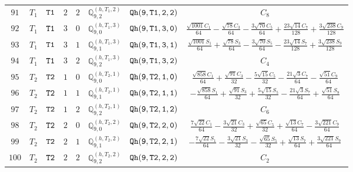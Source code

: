 \documentclass[fleqn,8pt]{jsarticle}
\begin{document}
\begin{table}[ht!]
\begin{center}
\begin{tabular}{cccccccc}
$ 91 $ & $ T_{1} $ & $ {\tt T1} $ & $ 2 $ & $ 2 $ & $ \mathbb{Q}_{9,2}^{(h,T_{1},2)} $ & $ {\tt Qh(9,T1,2,2)} $ & $ C_{8} $ \\
$ 92 $ & $ T_{1} $ & $ {\tt T1} $ & $ 3 $ & $ 0 $ & $ \mathbb{Q}_{9,0}^{(h,T_{1},3)} $ & $ {\tt Qh(9,T1,3,0)} $ & $ \frac{\sqrt{1001} C_{1}}{64} - \frac{\sqrt{78} C_{3}}{64} - \frac{3 \sqrt{70} C_{5}}{64} + \frac{23 \sqrt{14} C_{7}}{128} + \frac{3 \sqrt{238} C_{9}}{128} $ \\
$ 93 $ & $ T_{1} $ & $ {\tt T1} $ & $ 3 $ & $ 1 $ & $ \mathbb{Q}_{9,1}^{(h,T_{1},3)} $ & $ {\tt Qh(9,T1,3,1)} $ & $ \frac{\sqrt{1001} S_{1}}{64} + \frac{\sqrt{78} S_{3}}{64} - \frac{3 \sqrt{70} S_{5}}{64} - \frac{23 \sqrt{14} S_{7}}{128} + \frac{3 \sqrt{238} S_{9}}{128} $ \\
$ 94 $ & $ T_{1} $ & $ {\tt T1} $ & $ 3 $ & $ 2 $ & $ \mathbb{Q}_{9,2}^{(h,T_{1},3)} $ & $ {\tt Qh(9,T1,3,2)} $ & $ C_{4} $ \\
$ 95 $ & $ T_{2} $ & $ {\tt T2} $ & $ 1 $ & $ 0 $ & $ \mathbb{Q}_{9,0}^{(h,T_{2},1)} $ & $ {\tt Qh(9,T2,1,0)} $ & $ \frac{\sqrt{858} C_{1}}{64} + \frac{\sqrt{91} C_{3}}{32} - \frac{5 \sqrt{15} C_{5}}{32} - \frac{21 \sqrt{3} C_{7}}{64} - \frac{\sqrt{51} C_{9}}{64} $ \\
$ 96 $ & $ T_{2} $ & $ {\tt T2} $ & $ 1 $ & $ 1 $ & $ \mathbb{Q}_{9,1}^{(h,T_{2},1)} $ & $ {\tt Qh(9,T2,1,1)} $ & $ - \frac{\sqrt{858} S_{1}}{64} + \frac{\sqrt{91} S_{3}}{32} + \frac{5 \sqrt{15} S_{5}}{32} - \frac{21 \sqrt{3} S_{7}}{64} + \frac{\sqrt{51} S_{9}}{64} $ \\
$ 97 $ & $ T_{2} $ & $ {\tt T2} $ & $ 1 $ & $ 2 $ & $ \mathbb{Q}_{9,2}^{(h,T_{2},1)} $ & $ {\tt Qh(9,T2,1,2)} $ & $ C_{6} $ \\
$ 98 $ & $ T_{2} $ & $ {\tt T2} $ & $ 2 $ & $ 0 $ & $ \mathbb{Q}_{9,0}^{(h,T_{2},2)} $ & $ {\tt Qh(9,T2,2,0)} $ & $ \frac{7 \sqrt{22} C_{1}}{64} - \frac{3 \sqrt{21} C_{3}}{32} + \frac{\sqrt{65} C_{5}}{32} + \frac{\sqrt{13} C_{7}}{64} - \frac{3 \sqrt{221} C_{9}}{64} $ \\
$ 99 $ & $ T_{2} $ & $ {\tt T2} $ & $ 2 $ & $ 1 $ & $ \mathbb{Q}_{9,1}^{(h,T_{2},2)} $ & $ {\tt Qh(9,T2,2,1)} $ & $ - \frac{7 \sqrt{22} S_{1}}{64} - \frac{3 \sqrt{21} S_{3}}{32} - \frac{\sqrt{65} S_{5}}{32} + \frac{\sqrt{13} S_{7}}{64} + \frac{3 \sqrt{221} S_{9}}{64} $ \\
$ 100 $ & $ T_{2} $ & $ {\tt T2} $ & $ 2 $ & $ 2 $ & $ \mathbb{Q}_{9,2}^{(h,T_{2},2)} $ & $ {\tt Qh(9,T2,2,2)} $ & $ C_{2} $ \\
 \hline \hline
\end{tabular}
\end{center}
\end{table}
\end{document}
